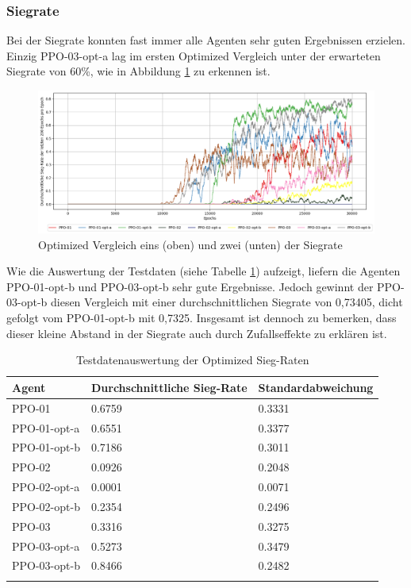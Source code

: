 \subsubsection{Siegrate}
Bei der Siegrate konnten fast immer alle Agenten sehr guten Ergebnissen erzielen. Einzig PPO-03-opt-a lag im ersten Optimized Vergleich unter der erwarteten Siegrate von 60\%, wie in Abbildung \ref{fig:Optimized_Winrate} zu erkennen ist.
\begin{figure}[H]
	\centering
	\includegraphics[scale=0.4517]{Abbildungen/Evaluation/optimized-winrate.png}
	\caption[Optimized Vergleich Siegrate]{Optimized Vergleich eins (oben) und zwei (unten) der Siegrate}
	\label{fig:Optimized_Winrate}
\end{figure}
Wie die Auswertung der Testdaten (siehe Tabelle \ref{tab:Evaluation_Testdaten_Winrate_Optimized}) aufzeigt, liefern die Agenten PPO-01-opt-b und PPO-03-opt-b sehr gute Ergebnisse. Jedoch gewinnt der PPO-03-opt-b diesen Vergleich mit einer durchschnittlichen Siegrate von 0,73405, dicht gefolgt vom PPO-01-opt-b mit 0,7325. Insgesamt ist dennoch zu bemerken, dass dieser kleine Abstand in der Siegrate auch durch Zufallseffekte zu erklären ist.
\begin{longtable}[h]{|p{3.2cm}|p{6cm}|p{4cm}|}
	\hline
	Agent & Durchschnittliche Sieg-Rate & Standardabweichung \\
	\hline
	PPO-01 & 0.6759 & 0.3331 \\ 
	\hline
	PPO-01-opt-a & 0.6551 & 0.3377 \\ 
	\hline
	PPO-01-opt-b & 0.7186 & 0.3011 \\ 
	\hline
	PPO-02 & 0.0926 & 0.2048 \\ 
	\hline
	PPO-02-opt-a & 0.0001 & 0.0071 \\ 
	\hline
	PPO-02-opt-b & 0.2354 & 0.2496 \\ 
	\hline
	PPO-03 & 0.3316 & 0.3275 \\ 
	\hline
	PPO-03-opt-a & 0.5273 & 0.3479 \\ 
	\hline
	PPO-03-opt-b & 0.8466 & 0.2482 \\ 
	\hline
	\caption{Testdatenauswertung der Optimized Sieg-Raten}
	\label{tab:Evaluation_Testdaten_Winrate_Optimized} 
\end{longtable}

